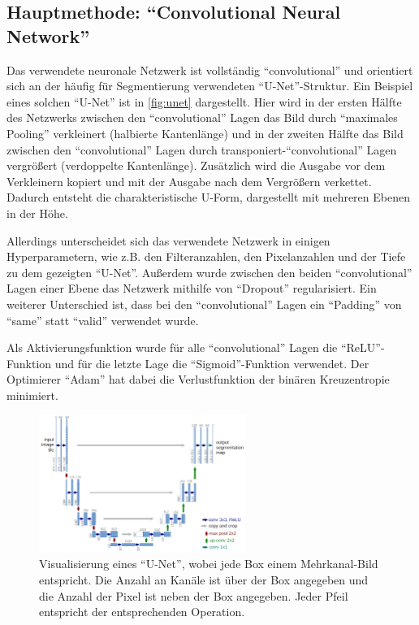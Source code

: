 \subsection{Hauptmethode: \enquote{Convolutional Neural Network}}
\label{ssec:Hauptmethode}

Das verwendete neuronale Netzwerk ist vollständig \enquote{convolutional} und orientiert sich an der häufig für Segmentierung verwendeten \enquote{U-Net}-Struktur.\cite{ronneberger2015unet}
Ein Beispiel eines solchen \enquote{U-Net} ist in \autoref{fig:unet} dargestellt.
Hier wird in der ersten Hälfte des Netzwerks zwischen den \enquote{convolutional} Lagen das Bild durch \enquote{maximales Pooling} verkleinert (halbierte Kantenlänge) 
und in der zweiten Hälfte das Bild zwischen den \enquote{convolutional} Lagen durch transponiert-\enquote{convolutional} Lagen vergrößert (verdoppelte Kantenlänge).
Zusätzlich wird die Ausgabe vor dem Verkleinern kopiert und mit der Ausgabe nach dem Vergrößern verkettet. 
Dadurch entsteht die charakteristische U-Form, dargestellt mit mehreren Ebenen in der Höhe.

Allerdings unterscheidet sich das verwendete Netzwerk in einigen Hyperparametern, wie z.B. den Filteranzahlen, den Pixelanzahlen und der Tiefe zu dem gezeigten \enquote{U-Net}.
Außerdem wurde zwischen den beiden \enquote{convolutional} Lagen einer Ebene das Netzwerk mithilfe von \enquote{Dropout} regularisiert.
Ein weiterer Unterschied ist, dass bei den \enquote{convolutional} Lagen ein \enquote{Padding} von \enquote{same} statt \enquote{valid} verwendet wurde.

Als Aktivierungsfunktion wurde für alle \enquote{convolutional} Lagen die \enquote{ReLU}-Funktion und für die letzte Lage die \enquote{Sigmoid}-Funktion verwendet.
Der Optimierer \enquote{Adam} hat dabei die Verlustfunktion der binären Kreuzentropie minimiert.

\begin{figure}
    \centering
    \includegraphics[width=0.6\textwidth]{images/unet.png}
    \caption{Visualisierung eines \enquote{U-Net}, %
    wobei jede Box einem Mehrkanal-Bild entspricht. Die Anzahl an Kanäle ist über der Box angegeben und die Anzahl der Pixel ist neben der Box angegeben. %
    Jeder Pfeil entspricht der entsprechenden Operation.\cite{ronneberger2015unet}}
    \label{fig:unet}
\end{figure}

